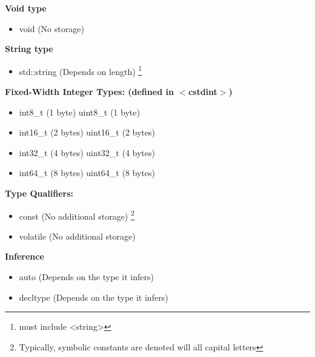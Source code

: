 \documentclass{report}
\begin{document}
\begin{minipage}{0.47\textwidth}
    \textbf{Void type}
    \begin{itemize}
        \item void (No storage)
    \end{itemize}
\end{minipage}
\begin{minipage}{0.47\textwidth}
    \textbf{String type}
    \begin{itemize}
        \item std::string (Depends on length) \footnote{must include <string>}
    \end{itemize}
\end{minipage}
\bigbreak \noindent \bigbreak \noindent 
\begin{minipage}[t]{0.47\textwidth}
    \textbf{Fixed-Width Integer Types: (defined in $<$cstdint$>$)}
    \begin{itemize}
        \item int8\_t (1 byte) \quad \quad \textbullet uint8\_t (1 byte)
        \item int16\_t (2 bytes) \quad \textbullet uint16\_t (2 bytes)
        \item int32\_t (4 bytes) \quad \textbullet uint32\_t (4 bytes)
        \item int64\_t (8 bytes) \quad \textbullet uint64\_t (8 bytes)
    \end{itemize}
\end{minipage}
\bigbreak \noindent \bigbreak \noindent 
\begin{minipage}[t]{0.47\textwidth}
    \textbf{Type Qualifiers:}
    \begin{itemize}
        \item const (No additional storage) \footnote{Typically, symbolic constants are denoted will all capital letters}
        \item volatile (No additional storage)
    \end{itemize}
\end{minipage}
\begin{minipage}[t]{0.47\textwidth}
    \textbf{Inference}
    \begin{itemize}
        \item auto (Depends on the type it infers)
        \item decltype (Depends on the type it infers)
    \end{itemize}
\end{minipage}
\end{document}
